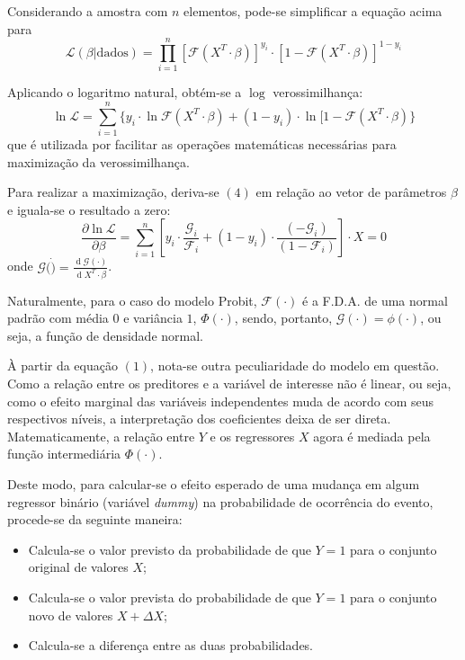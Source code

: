 \documentclass[12pt,
               openright,
               oneside,
               a4paper,
							 section=TITLE,     %
               subsection=Title,  %
               english,brazil]{article}
\begin{document}
Considerando a amostra com $n$ elementos, pode-se simplificar a equação acima para
\begin{equation}
\mathcal{L}(\beta | \text{dados}) = \prod_{i=1}^n [\mathcal{F}(X^T \cdot \beta)]^{y_i} \cdot [1- \mathcal{F}(X^T \cdot \beta)]^{1-y_i}
\end{equation}

Aplicando o logaritmo natural, obtém-se a $\log$ verossimilhança:
\begin{equation}
\ln \mathcal{L} = \sum_{i=1}^n \{ y_i \cdot \ln \mathcal{F}(X^T \cdot \beta) + (1-y_i) \cdot \ln [1 - \mathcal{F}(X^T \cdot \beta)\}
\end{equation}
que é utilizada por facilitar as operações matemáticas necessárias para maximização da verossimilhança.

Para realizar a maximização, deriva-se $(4)$ em relação ao vetor de parâmetros $\beta$ e iguala-se o resultado a zero:
\begin{equation}
\frac{\partial \ln \mathcal{L}}{\partial \beta} = \sum_{i=1}^n \left[ y_i \cdot \frac{\mathcal{G}_i}{\mathcal{F}_i} + (1-y_i) \cdot \frac{(-\mathcal{G}_i)}{(1-\mathcal{F}_i)} \right] \cdot X = 0
\end{equation}
onde $\mathcal{G}(\dot) = \frac{\operatorname{d} \mathcal{G}(\cdot)}{\operatorname{d} X^T \cdot \beta}$.

Naturalmente, para o caso do modelo Probit, $\mathcal{F}(\cdot)$ é a F.D.A. de uma normal padrão com média $0$ e variância $1$, $\Phi(\cdot)$, sendo, portanto, $\mathcal{G}(\cdot) = \phi(\cdot)$, ou seja, a função de densidade normal.

À partir da equação $(1)$, nota-se outra peculiaridade do modelo em questão. Como a relação entre os preditores e a variável de interesse não é linear, ou seja, como o efeito marginal das variáveis independentes muda de acordo com seus respectivos níveis,  a interpretação dos coeficientes deixa de ser direta. Matematicamente, a relação entre $Y$ e os regressores $X$ agora é mediada pela função intermediária $\Phi(\cdot)$.

Deste modo, para calcular-se o efeito esperado de uma mudança em algum regressor binário (variável \textit{dummy}) na probabilidade de ocorrência do evento, procede-se da seguinte maneira:

\begin{itemize} \item Calcula-se o valor previsto da probabilidade de que $Y=1$ para o conjunto original de valores $X$; 

\item Calcula-se o valor prevista do probabilidade de que $Y=1$ para o conjunto novo de valores $X + \Delta X$; \item Calcula-se a diferença entre as duas probabilidades. 
\end{itemize}
\end{document}
